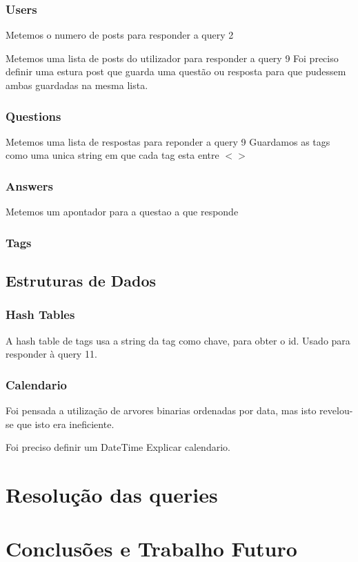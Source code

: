 \documentclass[10pt,a4paper]{report}
\begin{document}
        \subsection{Users}
        Metemos o numero de posts para responder a query 2

        Metemos uma lista de posts do utilizador para responder a query 9
        Foi preciso definir uma estura post que guarda uma questão ou resposta para
        que pudessem ambas guardadas na mesma lista.

        \subsection{Questions}
        Metemos uma lista de respostas para reponder a query 9
        Guardamos as tags como uma unica string em que cada tag esta entre
        $< >$


        \subsection{Answers}
        Metemos um apontador para a questao a que responde


        \subsection{Tags}

    \section{Estruturas de Dados}

        \subsection{Hash Tables}

        A hash table de tags usa a string da tag como chave, para obter o id.
        Usado para responder à query 11.

        \subsection{Calendario}
        Foi pensada a utilização de arvores binarias ordenadas por data, mas isto
        revelou-se que isto era ineficiente.

        Foi preciso definir um DateTime
        Explicar calendario.
    
\chapter{Resolução das queries}

\chapter{Conclusões e Trabalho Futuro}
\end{document}
